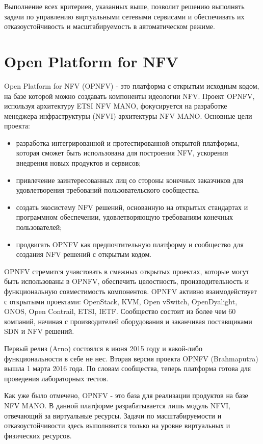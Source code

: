 \documentclass[oneside,final,14pt,a4paper]{extreport}
\begin{document}
Выполнение всех критериев, указанных выше, позволит решению выполнять задачи по управлению виртуальными сетевыми сервисами и обеспечивать их отказоустойчивость и масштабируемость в автоматическом режиме.


\section{Open Platform for NFV}
Open Platform for NFV (OPNFV) - это платформа с открытым исходным кодом, на базе которой можно создавать компоненты  идеологии NFV. Проект OPNFV, используя архитектуру ETSI NFV MANO, фокусируется на разработке менеджера инфраструктуры (NFVI) архитектуры NFV MANO.\cite{opnfv-official}
Основные цели проекта:
\begin{itemize}
	\item разработка интегрированной и протестированной открытой платформы, которая сможет быть использована для построения NFV, ускорения внедрения новых продуктов и сервисов;
	\item привлечение заинтересованных лиц со стороны конечных заказчиков для удовлетворения требований пользовательского сообщества.
	\item создать экосистему NFV решений, основанную на открытых стандартах и программном обеспечении, удовлетворяющую требованиям конечных пользователей;
	\item продвигать OPNFV как предпочтительную платформу и сообщество для создания NFV решений с открытым кодом.
\end{itemize}

OPNFV стремится учавстовать в смежных открытых проектах, которые могут быть использованы в OPNFV, обеспечить целостность, производительность и функциональную совместимость компонентов. OPNFV активно взаимодействует с открытыми проектами: OpenStack, KVM, Open vSwitch, OpenDyalight, ONOS, Open Contrail, ETSI, IETF. Сообщество состоит из более чем 60 компаний, начиная с производителей оборудования и заканчивая поставщиками SDN и NFV решений.

Первый релиз (Arno) состоялся в июня 2015 году и какой-либо функциональности в себе не нес. Вторая версия проекта OPNFV (Brahmaputra) вышла 1 марта 2016 года. По словам сообщества, теперь платформа готова для проведения лабораторных тестов.\cite{opnfv-state1}

Как уже было отмечено, OPNFV - это база для реализации продуктов на базе NFV MANO. В данной платформе разрабатывается лишь модуль NFVI, отвечающий за виртуальные ресурсы. Задачи по масштабируемости и отказоустойчивости здесь выполняются только на уровне виртуальных и физических ресурсов.
\end{document}
